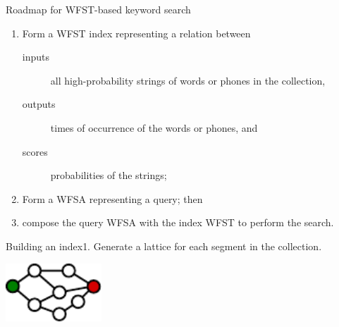\begin{frame}{Roadmap for WFST-based keyword search}{}
  \begin{enumerate}
  \item Form a WFST index representing a relation between
    \begin{description}
      \item[inputs] all high-probability strings of words or phones in
        the collection,
      \item[outputs] times of occurrence of the words or phones, and
      \item[scores] probabilities of the strings;
    \end{description}
    \item Form a WFSA representing a query; then
    \item \alert{compose} the query WFSA with the index WFST to
      perform the search.
  \end{enumerate}
\end{frame}

\begin{frame}{Building an index}{1. Generate a lattice for each segment in the collection.}
  \begin{center}
    \includegraphics[width=36mm]{figures/lattice}
  \end{center}
  \begin{overlayarea}{\textwidth}{24mm}
    \begin{columns}[t]
      \column{54mm}
      \column{54mm}
    \end{columns}
  \end{overlayarea}
\end{frame}


